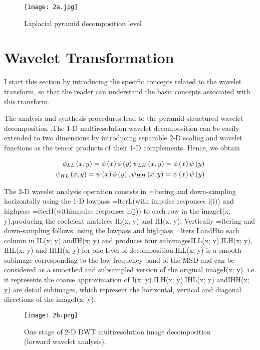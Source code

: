 \begin{figure}[h]
  \centering
  \texttt{[image: 2a.jpg]}
  \label{fig2}
  \caption{Laplacial pyramid decomposition level}
\end{figure}

\section{Wavelet Transformation}
I start this section by introducing the specific concepts related to the wavelet transform, so that the reader
can understand the basic concepts associated with this transform. \hfill \break

 The analysis and synthesis procedures lead to the
pyramid-structured wavelet decomposition \cite{9}.The 1-D multiresolution wavelet decomposition can be easily extended to two dimensions by introducing separable 2-D scaling and wavelet functions as the tensor products of their 1-D complements. Hence, we obtain

\begin{equation}
    \begin{split}
    {\phi }_{LL}\left(x,y \right)=\phi \left(x \right)\phi \left(y \right)\vspace{1cm}
    {\psi }_{LH}\left(x,y \right)=\phi \left(x \right)\psi  \left(y \right)\\
	{\psi }_{HL}\left(x,y \right)=\psi \left(x \right)\phi  \left(y \right),\vspace{1cm}
	{\psi }_{HH}\left(x,y \right)=\psi \left(x \right)\psi  \left(y \right)  
    \end{split}
\end{equation}

The 2-D wavelet analysis operation consists in =ltering and
down-sampling horizontally using the 1-D lowpass =lterL(with impulse responses l(i)) and highpass =lterH(withimpulse responses h(j)) to each row in the imageI(x; y),producing the coeIcient matrices IL(x; y) and IH(x; y).
Vertically =ltering and down-sampling follows, using the lowpass and highpass =lters LandHto each column in IL(x; y) andIH(x; y) and produces four subimagesILL(x; y),ILH(x; y), IHL(x; y) and IHH(x; y) for one level of decomposition.ILL(x; y) is a smooth subimage corresponding to the low-frequency band of the MSD and can be considered as a smoothed and subsampled version of the original imageI(x; y), i.e. it represents the coarse approximation of I(x; y).ILH(x; y),IHL(x; y) andIHH(x; y) are detail subimages, which represent the horizontal, vertical and diagonal
directions of the imageI(x; y).
\begin{figure}[h]
  \centering
  \texttt{[image: 2b.png]}
  \label{fig2}
  \caption{ One stage of 2-D DWT multiresolution image decomposition
(forward wavelet analysis).}
\end{figure}

